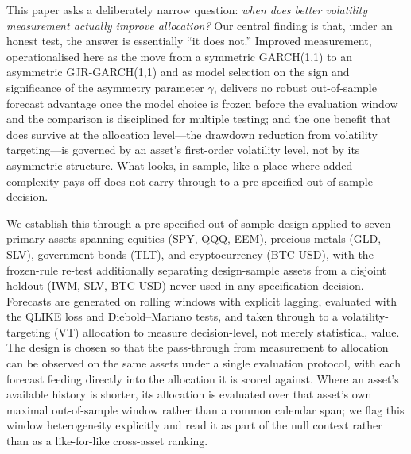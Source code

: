 This paper asks a deliberately narrow question: \emph{when does better volatility measurement actually improve allocation?} Our central finding is that, under an honest test, the answer is essentially ``it does not.'' Improved measurement, operationalised here as the move from a symmetric GARCH(1,1) to an asymmetric GJR-GARCH(1,1) and as model selection on the sign and significance of the asymmetry parameter $\gamma$, delivers no robust out-of-sample forecast advantage once the model choice is frozen before the evaluation window and the comparison is disciplined for multiple testing; and the one benefit that does survive at the allocation level---the drawdown reduction from volatility targeting---is governed by an asset's first-order volatility level, not by its asymmetric structure. What looks, in sample, like a place where added complexity pays off does not carry through to a pre-specified out-of-sample decision.

We establish this through a pre-specified out-of-sample design applied to seven primary assets spanning equities (SPY, QQQ, EEM), precious metals (GLD, SLV), government bonds (TLT), and cryptocurrency (BTC-USD), with the frozen-rule re-test additionally separating design-sample assets from a disjoint holdout (IWM, SLV, BTC-USD) never used in any specification decision. Forecasts are generated on rolling windows with explicit lagging, evaluated with the QLIKE loss and Diebold--Mariano tests, and taken through to a volatility-targeting (VT) allocation to measure decision-level, not merely statistical, value. The design is chosen so that the pass-through from measurement to allocation can be observed on the same assets under a single evaluation protocol, with each forecast feeding directly into the allocation it is scored against. Where an asset's available history is shorter, its allocation is evaluated over that asset's own maximal out-of-sample window rather than a common calendar span; we flag this window heterogeneity explicitly and read it as part of the null context rather than as a like-for-like cross-asset ranking.


